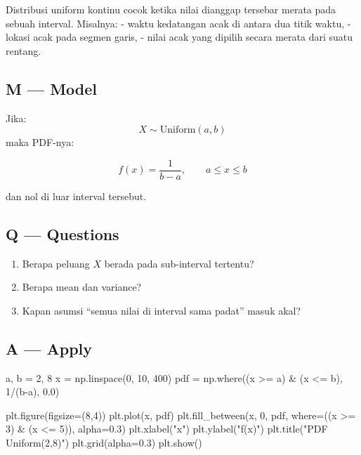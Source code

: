 \documentclass[
  letterpaper,
  DIV=11,
  numbers=noendperiod]{scrreprt}
\newenvironment{Shaded}{\begin{snugshade}}{\end{snugshade}}
\newcommand{\DecValTok}[1]{\textcolor[rgb]{0.68,0.00,0.00}{#1}}
\newcommand{\FloatTok}[1]{\textcolor[rgb]{0.68,0.00,0.00}{#1}}
\newcommand{\NormalTok}[1]{\textcolor[rgb]{0.00,0.23,0.31}{#1}}
\newcommand{\OperatorTok}[1]{\textcolor[rgb]{0.37,0.37,0.37}{#1}}
\newcommand{\StringTok}[1]{\textcolor[rgb]{0.13,0.47,0.30}{#1}}
\providecommand{\tightlist}{%
  \setlength{\itemsep}{0pt}\setlength{\parskip}{0pt}}
\begin{document}
Distribusi uniform kontinu cocok ketika nilai dianggap tersebar merata
pada sebuah interval. Misalnya: - waktu kedatangan acak di antara dua
titik waktu, - lokasi acak pada segmen garis, - nilai acak yang dipilih
secara merata dari suatu rentang.

\subsection{M --- Model}\label{m-model-20}

Jika: \[
X \sim \mathrm{Uniform}(a,b)
\] maka PDF-nya:

\[
f(x)=\frac{1}{b-a}, \qquad a \le x \le b
\]

dan nol di luar interval tersebut.

\subsection{Q --- Questions}\label{q-questions-20}

\begin{enumerate}
\def\labelenumi{\arabic{enumi}.}
\tightlist
\item
  Berapa peluang \(X\) berada pada sub-interval tertentu?
\item
  Berapa mean dan variance?
\item
  Kapan asumsi ``semua nilai di interval sama padat'' masuk akal?
\end{enumerate}

\subsection{A --- Apply}\label{a-apply-20}

\begin{Shaded}
\begin{Highlighting}[]
\NormalTok{a, b }\OperatorTok{=} \DecValTok{2}\NormalTok{, }\DecValTok{8}
\NormalTok{x }\OperatorTok{=}\NormalTok{ np.linspace(}\DecValTok{0}\NormalTok{, }\DecValTok{10}\NormalTok{, }\DecValTok{400}\NormalTok{)}
\NormalTok{pdf }\OperatorTok{=}\NormalTok{ np.where((x }\OperatorTok{\textgreater{}=}\NormalTok{ a) }\OperatorTok{\&}\NormalTok{ (x }\OperatorTok{\textless{}=}\NormalTok{ b), }\DecValTok{1}\OperatorTok{/}\NormalTok{(b}\OperatorTok{{-}}\NormalTok{a), }\FloatTok{0.0}\NormalTok{)}

\NormalTok{plt.figure(figsize}\OperatorTok{=}\NormalTok{(}\DecValTok{8}\NormalTok{,}\DecValTok{4}\NormalTok{))}
\NormalTok{plt.plot(x, pdf)}
\NormalTok{plt.fill\_between(x, }\DecValTok{0}\NormalTok{, pdf, where}\OperatorTok{=}\NormalTok{((x }\OperatorTok{\textgreater{}=} \DecValTok{3}\NormalTok{) }\OperatorTok{\&}\NormalTok{ (x }\OperatorTok{\textless{}=} \DecValTok{5}\NormalTok{)), alpha}\OperatorTok{=}\FloatTok{0.3}\NormalTok{)}
\NormalTok{plt.xlabel(}\StringTok{"x"}\NormalTok{)}
\NormalTok{plt.ylabel(}\StringTok{"f(x)"}\NormalTok{)}
\NormalTok{plt.title(}\StringTok{"PDF Uniform(2,8)"}\NormalTok{)}
\NormalTok{plt.grid(alpha}\OperatorTok{=}\FloatTok{0.3}\NormalTok{)}
\NormalTok{plt.show()}
\end{Highlighting}
\end{Shaded}
\end{document}
